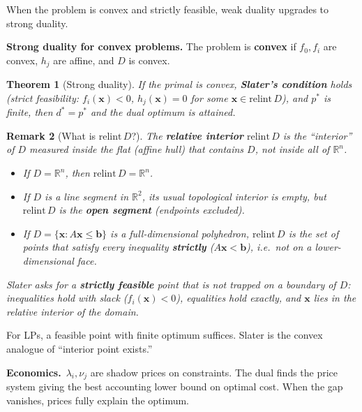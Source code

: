 \documentclass[11pt,a4paper]{article}
\newtheorem{theorem}{Theorem}
\newtheorem{remark}[theorem]{Remark}
\newcommand{\econ}[1]{\medskip\noindent\textbf{Economics.}\ #1\medskip}
\begin{document}
When the problem is convex and strictly feasible, weak duality upgrades to strong duality.

\textbf{Strong duality for convex problems.}
The problem is \textbf{convex} if $f_0,f_i$ are convex, $h_j$ are affine, and $D$ is convex.

\begin{theorem}[Strong duality]
If the primal is convex, \textbf{Slater's condition} holds (strict feasibility:
$f_i(\mathbf{x})<0$, $h_j(\mathbf{x})=0$ for some $\mathbf{x}\in\mathrm{relint}\,D$),
and $p^*$ is finite, then $d^*=p^*$ and the dual optimum is attained.
\end{theorem}

\begin{remark}[What is $\mathrm{relint}\,D$?]
The \textbf{relative interior} $\mathrm{relint}\,D$ is the ``interior'' of $D$ measured inside the
flat (affine hull) that contains $D$, not inside all of $\mathbb{R}^n$.
\begin{itemize}[nosep,leftmargin=*]
  \item If $D=\mathbb{R}^n$, then $\mathrm{relint}\,D=\mathbb{R}^n$.
  \item If $D$ is a line segment in $\mathbb{R}^2$, its usual topological interior is empty,
        but $\mathrm{relint}\,D$ is the \textbf{open segment} (endpoints excluded).
  \item If $D=\{\mathbf{x}:A\mathbf{x}\le\mathbf{b}\}$ is a full-dimensional polyhedron,
        $\mathrm{relint}\,D$ is the set of points that satisfy every inequality \textbf{strictly}
        ($A\mathbf{x}<\mathbf{b}$), i.e.\ not on a lower-dimensional face.
\end{itemize}
Slater asks for a \textbf{strictly feasible} point that is not trapped on a boundary of $D$:
inequalities hold with slack ($f_i(\mathbf{x})<0$), equalities hold exactly, and $\mathbf{x}$ lies
in the relative interior of the domain.
\end{remark}

For LPs, a feasible point with finite optimum suffices.
Slater is the convex analogue of ``interior point exists.''

\econ{$\lambda_i,\nu_j$ are shadow prices on constraints.
The dual finds the price system giving the best accounting lower bound on optimal cost.
When the gap vanishes, prices fully explain the optimum.}
\end{document}
